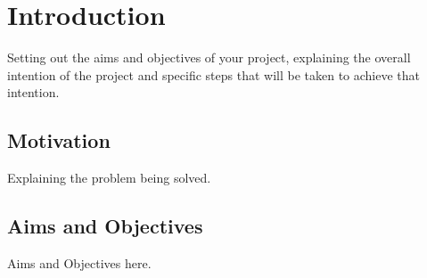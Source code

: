 \chapter{Introduction}

Setting out the aims and objectives of your project, explaining the overall intention of the project and specific steps that will be taken to achieve that intention.

\section{Motivation}

Explaining the problem being solved.


\section{Aims and Objectives}

Aims and Objectives here.